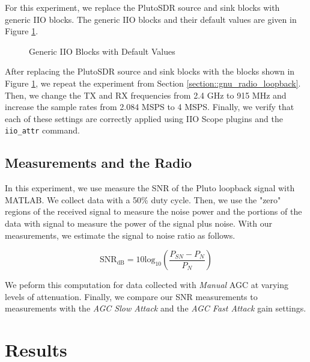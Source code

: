 \documentclass{article}
\begin{document}
For this experiment, we replace the PlutoSDR source and sink blocks with generic IIO blocks. The generic IIO blocks and their default values are given in Figure \ref{fig::generic_iio_blocks}.

\begin{figure}[H]
	\centerline{}
	\caption{Generic IIO Blocks with Default Values}
	\label{fig::generic_iio_blocks}
\end{figure}

After replacing the PlutoSDR source and sink blocks with the blocks shown in Figure \ref{fig::generic_iio_blocks}, we repeat the experiment from Section \ref{section::gnu_radio_loopback}. Then, we change the TX and RX frequencies from 2.4 GHz to 915 MHz and increase the sample rates from 2.084 MSPS to 4 MSPS. Finally, we verify that each of these settings are correctly applied using IIO Scope plugins and the \texttt{iio\_attr} command. 

\subsection{Measurements and the Radio}
\label{section::snr_measurement}

In this experiment, we use measure the SNR of the Pluto loopback signal with MATLAB. We collect data with a 50\% duty cycle. Then, we use the "zero" regions of the received signal to measure the noise power and the portions of the data with signal to measure the power of the signal plus noise. With our measurements, we estimate the signal to noise ratio as follows.

\begin{equation*}
	\text{SNR}_\text{dB} = 10\text{log}_{10}\left(\frac{P_{SN} - P_{N}}{P_{N}}\right)
	\label{eq::snr_estimate}
\end{equation*}

We peform this computation for data collected with \textit{Manual} AGC at varying levels of attenuation. Finally, we compare our SNR measurements to measurements with the \textit{AGC Slow Attack} and the \textit{AGC Fast Attack} gain settings.

\section{Results}
\end{document}
